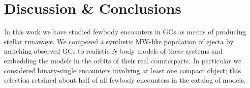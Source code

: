 \documentclass[twocolumn]{aastex631}
\newcommand{\kms}{${\rm km~s^{-1}}$}
\newcommand{\CMC}{\texttt{CMC}}
\begin{document}

%

\section{Discussion \& Conclusions} \label{sec:disccon}

In this work we have studied fewbody encounters in GCs as means of producing stellar runaways.
We composed a synthetic MW-like population of ejecta by matching observed GCs to realistic $N$-body models of these systems and embedding the models in the orbits of their real counterparts.
In particular we considered binary-single encounters involving at least one compact object; this selection retained about half of all fewbody encounters in the catalog of models.
\end{document}
